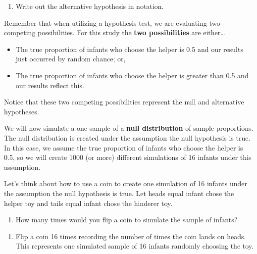 \documentclass[
]{report}
\providecommand{\tightlist}{%
  \setlength{\itemsep}{0pt}\setlength{\parskip}{0pt}}
\begin{document}
\vspace{0.4in}

\vspace{1in}

\begin{enumerate}
\def\labelenumi{\arabic{enumi}.}
\setcounter{enumi}{7}
\tightlist
\item
  Write out the alternative hypothesis in notation.
\end{enumerate}

\vspace{0.5in}

Remember that when utilizing a hypothesis test, we are evaluating two competing possibilities. For this study the \textbf{two possibilities} are either\ldots{}

\begin{itemize}
\item
  The true proportion of infants who choose the helper is 0.5 and our results just occurred by random chance; or,
\item
  The true proportion of infants who choose the helper is greater than 0.5 and our results reflect this.
\end{itemize}

Notice that these two competing possibilities represent the null and alternative hypotheses.

We will now simulate a one sample of a \textbf{null distribution} of sample proportions. The null distribution is created under the assumption the null hypothesis is true. In this case, we assume the true proportion of infants who choose the helper is 0.5, so we will create 1000 (or more) different simulations of 16 infants under this assumption.

Let's think about how to use a coin to create one simulation of 16 infants under the assumption the null hypothesis is true. Let heads equal infant chose the helper toy and tails equal infant chose the hinderer toy.

\begin{enumerate}
\def\labelenumi{\arabic{enumi}.}
\setcounter{enumi}{8}
\tightlist
\item
  How many times would you flip a coin to simulate the sample of infants?
\end{enumerate}

\vspace{0.2in}

\begin{enumerate}
\def\labelenumi{\arabic{enumi}.}
\setcounter{enumi}{9}
\tightlist
\item
  Flip a coin 16 times recording the number of times the coin lands on heads. This represents one simulated sample of 16 infants randomly choosing the toy.
\end{enumerate}
\end{document}
